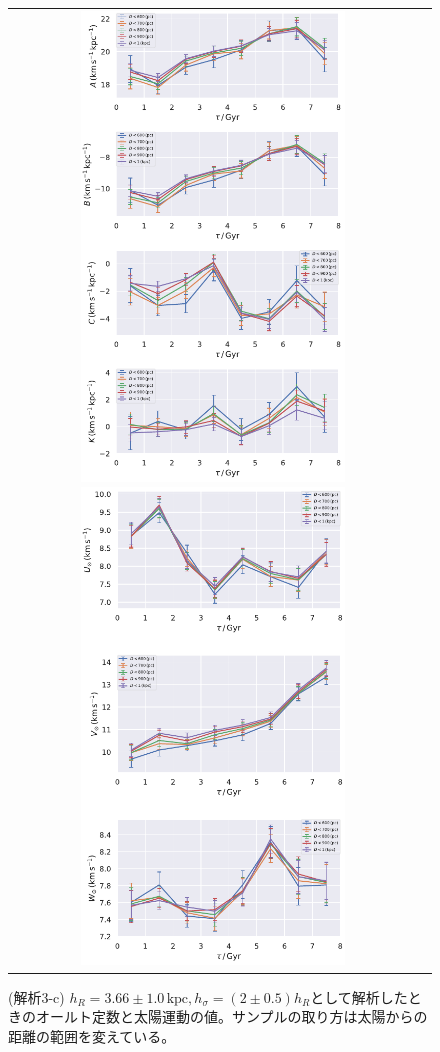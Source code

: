 \begin{figure}[htbp]
   \centering
\begin{tabular}{cc}
\includegraphics[width=7cm]{fig/ABCK_3c.pdf}
\includegraphics[width=7cm]{fig/UVW_3c.pdf}
\end{tabular}
    \caption{(解析3-c) $h_R=3.66\pm 1.0\,\mathrm{kpc},h_{\sigma}=(2\pm 0.5)h_R$として解析したときのオールト定数と太陽運動の値。サンプルの取り方は太陽からの距離の範囲を変えている。}
    \label{figObs3c}
\end{figure}


